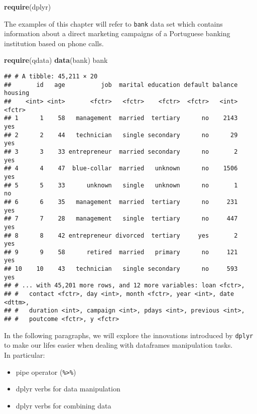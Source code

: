 \documentclass[]{book}
\newenvironment{Shaded}{\begin{snugshade}}{\end{snugshade}}
\newcommand{\KeywordTok}[1]{\textcolor[rgb]{0.13,0.29,0.53}{\textbf{{#1}}}}
\newcommand{\NormalTok}[1]{{#1}}
\providecommand{\tightlist}{%
  \setlength{\itemsep}{0pt}\setlength{\parskip}{0pt}}
\def\tightlist{}
\begin{document}
\begin{Shaded}
\begin{Highlighting}[]
\KeywordTok{require}\NormalTok{(dplyr)}
\end{Highlighting}
\end{Shaded}

The examples of this chapter will refer to \texttt{bank} data set which
contains information about a direct marketing campaigns of a Portuguese
banking institution based on phone calls.

\begin{Shaded}
\begin{Highlighting}[]
\KeywordTok{require}\NormalTok{(qdata)}
\KeywordTok{data}\NormalTok{(bank) }
\NormalTok{bank}
\end{Highlighting}
\end{Shaded}

\begin{verbatim}
## # A tibble: 45,211 × 20
##       id   age          job  marital education default balance housing
##    <int> <int>       <fctr>   <fctr>    <fctr>  <fctr>   <int>  <fctr>
## 1      1    58   management  married  tertiary      no    2143     yes
## 2      2    44   technician   single secondary      no      29     yes
## 3      3    33 entrepreneur  married secondary      no       2     yes
## 4      4    47  blue-collar  married   unknown      no    1506     yes
## 5      5    33      unknown   single   unknown      no       1      no
## 6      6    35   management  married  tertiary      no     231     yes
## 7      7    28   management   single  tertiary      no     447     yes
## 8      8    42 entrepreneur divorced  tertiary     yes       2     yes
## 9      9    58      retired  married   primary      no     121     yes
## 10    10    43   technician   single secondary      no     593     yes
## # ... with 45,201 more rows, and 12 more variables: loan <fctr>,
## #   contact <fctr>, day <int>, month <fctr>, year <int>, date <dttm>,
## #   duration <int>, campaign <int>, pdays <int>, previous <int>,
## #   poutcome <fctr>, y <fctr>
\end{verbatim}

In the following paragraphs, we will explore the innovations introduced
by \texttt{dplyr} to make our lifes easier when dealing with dataframes
manipulation tasks.\\
In particular:

\begin{itemize}
\tightlist
\item
  pipe operator (\texttt{\%\textgreater{}\%})
\item
  dplyr verbs for data manipulation
\item
  dplyr verbs for combining data
\end{itemize}
\end{document}
